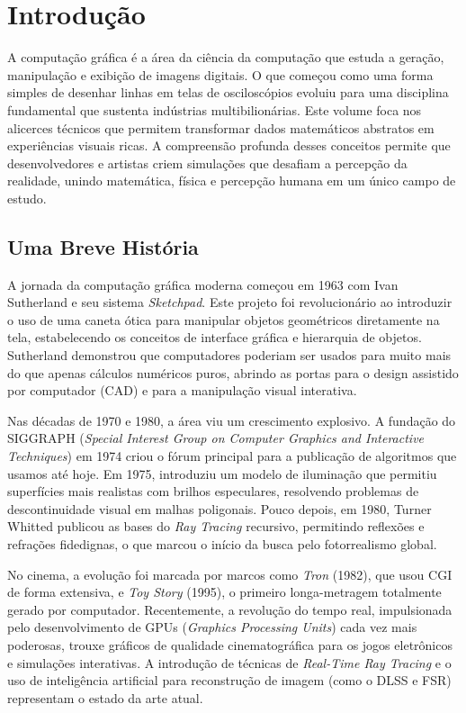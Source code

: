 \chapter{Introdução}

A computação gráfica é a área da ciência da computação que estuda a geração, manipulação e exibição de imagens digitais. O que começou como uma forma simples de desenhar linhas em telas de osciloscópios evoluiu para uma disciplina fundamental que sustenta indústrias multibilionárias. Este volume foca nos alicerces técnicos que permitem transformar dados matemáticos abstratos em experiências visuais ricas. A compreensão profunda desses conceitos permite que desenvolvedores e artistas criem simulações que desafiam a percepção da realidade, unindo matemática, física e percepção humana em um único campo de estudo.

\section{Uma Breve História}

A jornada da computação gráfica moderna começou em 1963 com Ivan Sutherland e seu sistema \textit{Sketchpad}. Este projeto foi revolucionário ao introduzir o uso de uma caneta ótica para manipular objetos geométricos diretamente na tela, estabelecendo os conceitos de interface gráfica e hierarquia de objetos. Sutherland demonstrou que computadores poderiam ser usados para muito mais do que apenas cálculos numéricos puros, abrindo as portas para o design assistido por computador (CAD) e para a manipulação visual interativa.

Nas décadas de 1970 e 1980, a área viu um crescimento explosivo. A fundação do SIGGRAPH (\textit{Special Interest Group on Computer Graphics and Interactive Techniques}) em 1974 criou o fórum principal para a publicação de algoritmos que usamos até hoje. Em 1975, \textcite{phong1975illumination} introduziu um modelo de iluminação que permitiu superfícies mais realistas com brilhos especulares, resolvendo problemas de descontinuidade visual em malhas poligonais. Pouco depois, em 1980, Turner Whitted publicou as bases do \textit{Ray Tracing} recursivo, permitindo reflexões e refrações fidedignas, o que marcou o início da busca pelo fotorrealismo global.

No cinema, a evolução foi marcada por marcos como \textit{Tron} (1982), que usou CGI de forma extensiva, e \textit{Toy Story} (1995), o primeiro longa-metragem totalmente gerado por computador. Recentemente, a revolução do tempo real, impulsionada pelo desenvolvimento de GPUs (\textit{Graphics Processing Units}) cada vez mais poderosas, trouxe gráficos de qualidade cinematográfica para os jogos eletrônicos e simulações interativas. A introdução de técnicas de \textit{Real-Time Ray Tracing} e o uso de inteligência artificial para reconstrução de imagem (como o DLSS e FSR) representam o estado da arte atual.

